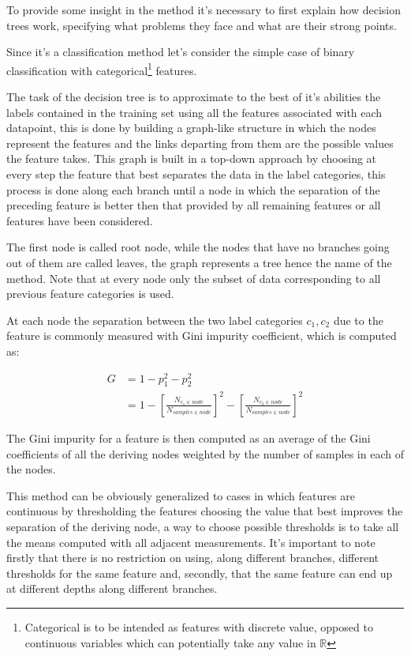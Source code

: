 To provide some insight in the method it's necessary to first explain how decision trees work, specifying what problems they face and what are their strong points.

Since it's a classification method let's consider the simple case of binary classification with categorical\footnote{Categorical is to be intended as features with discrete value, opposed to continuous variables which can potentially take any value in $\mathbb{R}$} features. 

The task of the decision tree is to approximate to the best of it's abilities the labels contained in the training set using all the features associated with each datapoint, this is done by building a graph-like structure in which the nodes represent the features and the links departing from them are the possible values the feature takes. This graph is built in a top-down approach by choosing at every step the feature that best separates the data in the label categories, this process is done along each branch until a node in which the separation of the preceding feature is better then that provided by all remaining features or all features have been considered. 

The first node is called root node, while the nodes that have no branches going out of them are called leaves, the graph represents a tree hence the name of the method. Note that at every node only the subset of data corresponding to all previous feature categories is used.

At each node the separation between the two label categories $c_1, c_2$ due to the feature is commonly measured with Gini impurity coefficient, which is computed as:

\begin{equation}
	\begin{split}
		G &= 1 - p^2_1 -p^2_2 \\
		   &= 1 - \left[ \frac{N_{c_1\in node}}{N_{samples\in node} } \right]^2 - \left[\frac{N_{c_2\in node}}{N_{samples\in node}} \right]^2
	\end{split}
\end{equation}

The Gini impurity for a feature is then computed as an average of the Gini coefficients of all the deriving nodes weighted by the number of samples in each of the nodes. 

This method can be obviously generalized to cases in which features are continuous by thresholding the features choosing the value that best improves the separation of the deriving node, a way to choose possible thresholds is to take all the means computed with all adjacent measurements. It's important to note firstly that there is no restriction on using, along different branches, different thresholds for the same feature and, secondly, that the same feature can end up at different depths along different branches. 

